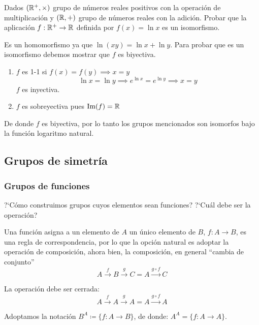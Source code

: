 \begin{fmd-example}
	Dados $(\mathbb{R}^{+}, \times)$ grupo de números reales positivos con la operación de multiplicación y $(\mathbb{R}, +)$ grupo de números reales con la adición. Probar que la aplicación $f: \mathbb{R}^{+} \rightarrow \mathbb{R}$ definida por $f(x) = \ln x$ es un isomorfismo.
	
	Es un homomorfismo ya que $\ln(xy) = \ln x + \ln y$. Para probar que es un isomorfismo debemos mostrar que $f$ es biyectiva.
	
	\begin{enumerate}[label=\alph*)]
		\item $f$ es 1-1 si $f(x) = f(y) \implies x = y$
		\[ \ln x = \ln y \implies e^{\ln x} = e^{\ln y} \implies x = y \]
		$f$ es inyectiva.
		
		\item $f$ es sobreyectiva pues $\mbox{Im}(f) = \mathbb{R}$
		
		\begin{figure}[H]
			\centering
			
		\end{figure}
	\end{enumerate}
	De donde $f$ es biyectiva, por lo tanto los grupos mencionados son isomorfos bajo la función logaritmo natural.
\end{fmd-example}

\subsection{Grupos de simetría}
\subsubsection{Grupos de funciones} 
?`Cómo construimos grupos cuyos elementos sean funciones? ?`Cuál debe ser la operación?

Una función asigna a un elemento de $A$ un único elemento de $B$, $f: A \rightarrow B$, es una regla de correspondencia, por lo que la opción natural es adoptar la operación de composición, ahora bien, la composición, en general ``cambia de conjunto''  \[A \xrightarrow{f} B \xrightarrow{g} C = A \xrightarrow{g \circ f} C\]

La operación debe ser cerrada:
\[A \xrightarrow{f} A \xrightarrow{g} A = A \xrightarrow{g \circ f} A\]

Adoptamos la notación $B^A \coloneqq \{ f: A \rightarrow B \}$, de donde: $A^A = \{ f: A \rightarrow A \}$.


